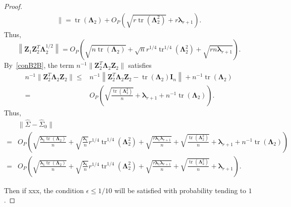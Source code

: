 \documentclass[12pt]{article} %
\DeclareMathOperator{\mytr}{tr}
\newcommand{\bZ}{\mathbf{Z}}
\newcommand{\bI}{\mathbf{I}}
\newcommand{\bfsym}[1]{\ensuremath{\boldsymbol{#1}}}
\def\blambda {\bfsym {\lambda}}
\def\bLambda {\bfsym {\Lambda}}
\theoremstyle{definition}
\begin{document}
\begin{appendices}
\begin{proof}
\begin{equation*}
\begin{split}
        \|
        =
        \mytr(\bLambda_2)+ O_P\left(
            \sqrt{r\mytr\left(\bLambda_2^2\right)}
            +r\blambda_{r+1}
        \right).
    \end{split}
\end{equation*}
Thus, 
\begin{equation}\label{firstTermNao}
\left\| \bZ_1 \bZ_2^T \bLambda_2^{1/2}\right\|
=
O_P\left(\sqrt{n\mytr(\bLambda_2)}
    +\sqrt{n}r^{1/4}\mytr^{1/4}(\bLambda_2^2)
+\sqrt{rn \blambda_{r+1}}
\right)
.
\end{equation}
By~\eqref{conB2B}, the term $
n^{-1}\|\bZ_2^T \bLambda_2 \bZ_2\|
$ satisfies
\begin{equation*}
    \begin{split}
n^{-1}\|\bZ_2^T \bLambda_2 \bZ_2\|
 \leq& 
     n^{-1}\left\| \bZ_2^T \bLambda_2\bZ_2-\mytr(\bLambda_2)\bI_n\right\|
     +n^{-1}
     \mytr(\bLambda_2)
     \\
     =&O_P\left( 
\sqrt{\frac{\mytr\left(\bLambda_2^2\right)}{n}}+\blambda_{r+1}
     +
     n^{-1}\mytr(\bLambda_2)
 \right)
     .
    \end{split}
\end{equation*}
Thus,
\begin{equation*}
    \begin{split}
    &\|\hat{\Sigma}-\hat{\Sigma}_0\|
    \\
    =&O_P\left(
        \sqrt{\frac{\blambda_1 \mytr(\bLambda_2)}{n}}
        +\sqrt{\frac{\blambda_1}{n}} r^{1/4} \mytr^{1/4}(\bLambda_2^2)
        +\sqrt{\frac{r\blambda_1 \blambda_{r+1}}{n}}
+
            \sqrt{\frac{\mytr\left(\bLambda_2^2\right)}{n}}+\blambda_{r+1}+n^{-1}\mytr(\bLambda_2)
        \right)
        \\
    =&O_P\left(
        \sqrt{\frac{\blambda_1 \mytr(\bLambda_2)}{n}}
        +\sqrt{\frac{\blambda_1}{n}} r^{1/4} \mytr^{1/4}(\bLambda_2^2)
        +\sqrt{\frac{r\blambda_1 \blambda_{r+1}}{n}}
+
            \sqrt{\frac{\mytr\left(\bLambda_2^2\right)}{n}}+\blambda_{r+1}
        \right)
        .
    \end{split}
\end{equation*}


Then if xxx, the condition $\epsilon\leq 1/10$ will be satisfied with probability tending to $1$.


\end{proof}
\end{appendices}
\end{document}
